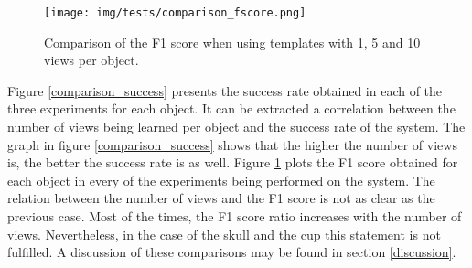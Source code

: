 	\begin{figure}[H]
		\begin{center}
	    \texttt{[image: img/tests/comparison\_fscore.png]}
		\caption[Comparison of the F1 score]{Comparison of the F1 score when using templates with 1, 5 and 10 views per object.}
		\label{comparison_fscore}
		\end{center}
	\end{figure}

	Figure \ref{comparison_success} presents the success rate obtained in each of the three experiments for each object. 
	It can be extracted a correlation between the number of views being learned per object and the success rate of the system. 
	The graph in figure \ref{comparison_success} shows that the higher the number of views is, the better the success rate is as well. 
	Figure \ref{comparison_fscore} plots the F1 score obtained for each object in every of the experiments being performed on the system. 
	The relation between the number of views and the F1 score is not as clear as the previous case. 
	Most of the times, the F1 score ratio increases with the number of views. 
	Nevertheless, in the case of the skull and the cup this statement is not fulfilled. 
	A discussion of these comparisons may be found in section \ref{discussion}.